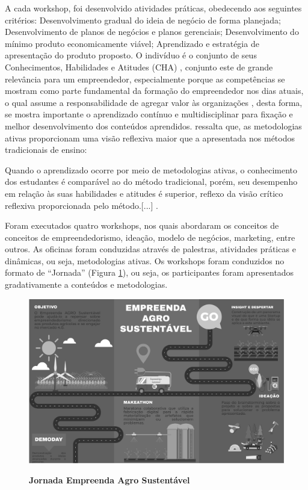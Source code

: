 A cada workshop, foi desenvolvido atividades práticas, obedecendo aos seguintes critérios: 
Desenvolvimento gradual do ideia de negócio de forma planejada; Desenvolvimento de planos de negócios e planos gerenciais; Desenvolvimento do mínimo produto economicamente viável; Aprendizado e estratégia de apresentação do produto proposto. O indivíduo é o conjunto de seus Conhecimentos, Habilidades e Atitudes (CHA) \cite{dutra_competencias:_2004}, conjunto este de grande relevância para um empreendedor, especialmente porque as competências se mostram como parte fundamental da formação do empreendedor nos dias atuais, o qual assume a responsabilidade de agregar valor às organizações \cite{ferreira_conhecimento_2019}, desta forma, se mostra importante o aprendizado contínuo e multidisciplinar para fixação e melhor desenvolvimento dos conteúdos aprendidos.  ressalta que, as metodologias ativas proporcionam uma visão reflexiva maior que a apresentada nos métodos tradicionais de ensino: 

\begin{citacao}
[...] Quando o aprendizado ocorre por meio de metodologias ativas, o conhecimento dos estudantes é comparável ao do método tradicional, porém, seu desempenho em relação às suas habilidades e atitudes é superior, reflexo da visão crítico reflexiva proporcionada pelo método.[...] \cite{limberger_metodologias_2013}.
\end{citacao}


Foram executados quatro workshops, nos quais abordaram os conceitos de  conceitos de empreendedorismo, ideação, modelo de negócios, marketing, entre outros. As oficinas foram conduzidas através de palestras, atividades práticas e dinâmicas, ou seja, metodologias ativas. Os workshops foram conduzidos no formato de “Jornada” (Figura \ref{figura_17}), ou seja, os participantes foram apresentados gradativamente a conteúdos e metodologias. 


\begin{figure}[!htb]
\centering
\caption{\textbf{Jornada Empreenda Agro Sustentável}}
\includegraphics[scale=0.4]{Imagens/jornada.png}
\label{figura_17}
\end{figure}

